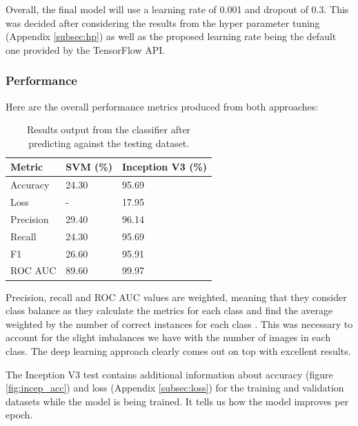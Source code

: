 \documentclass[12pt,a4paper]{report}
\begin{document}
\par

Overall, the final model will use a learning rate of 0.001 and dropout of 0.3. This was decided after considering the 
results from the hyper parameter tuning (Appendix \ref{subsec:hp}) as well as the proposed learning rate being the 
default one provided by the TensorFlow API.

\subsubsection{Performance}

Here are the overall performance metrics produced from both approaches:

\begin{table}[h!]
    \centering
    \begin{tabular}{ |l|l|l| }
        \hline
        Metric & SVM (\%) & Inception V3 (\%) \\
        \hline
        \hline
        Accuracy & 24.30 & 95.69 \\
        \hline
        Loss & - & 17.95 \\
        \hline
        Precision & 29.40 & 96.14 \\
        \hline
        Recall & 24.30 & 95.69 \\
        \hline
        F1 & 26.60 & 95.91 \\
        \hline
        ROC AUC & 89.60 & 99.97 \\
        \hline
    \end{tabular}
    \caption{Results output from the classifier after predicting against the testing dataset.}
    \label{table:2}
\end{table}

\break

Precision, recall and ROC AUC values are weighted, meaning that they consider class balance as they calculate the metrics
for each class and find the average weighted by the number of correct instances for each class 
\citep{scikitprec}. This was necessary to account for the slight imbalances we have with the number of images 
in each class. The deep learning approach clearly comes out on top with excellent results.

\par

The Inception V3 test contains additional information about accuracy (figure \ref{fig:incep_acc}) and loss 
(Appendix \ref{subsec:loss}) for the training and validation datasets 
while the model is being trained. It tells us how the model improves per epoch.
\end{document}
